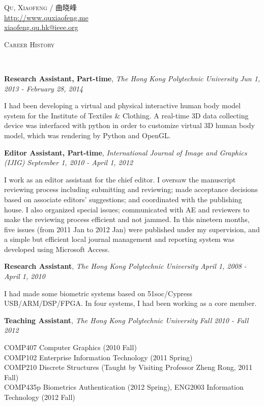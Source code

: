 \documentclass[9pt]{article}
\newenvironment{changemargin}[2]{%
  \begin{list}{}{%
    \setlength{\topsep}{0pt}%
    \setlength{\leftmargin}{#1}%
    \setlength{\rightmargin}{#2}%
    \setlength{\listparindent}{\parindent}%
    \setlength{\itemindent}{\parindent}%
    \setlength{\parsep}{\parskip}%
  }%
  \item[]}{\end{list}
}
\newcommand{\lineover}{
	\begin{changemargin}{-0.05in}{-0.05in}
		\vspace*{-8pt}
		\hrulefill \\
		\vspace*{-2pt}
	\end{changemargin}
}
\newcommand{\header}[1]{
	\begin{changemargin}{-0.5in}{-0.5in}
		\scshape{#1}\\
  	\lineover
	\end{changemargin}
}
\newcommand{\contact}[3]{
	\begin{changemargin}{-0.5in}{-0.5in}
		\begin{center}
			{\Large \scshape {#1}}\\ \smallskip
      {\url{#2}}\\ \smallskip 
      {\href{mailto:#3}{#3}}\\ \smallskip
		\end{center}
	\end{changemargin}
}
\newcommand{\jobtitle}[3]{
	\textbf{#1}, \emph{#2} \hfill \emph{#3}\\
}
\newcommand{\jobdescription}[1]{
	\begin{changemargin}{0.15in}{0.15in}
    \smallskip
		{#1}
    \medskip
	\end{changemargin}
}
\newenvironment{body} {
	\vspace*{-16pt}
	\begin{changemargin}{-0.25in}{-0.5in}
  }	
	{\end{changemargin}
}
\begin{document}
\contact{Qu, Xiaofeng / 曲晓峰}{http://www.quxiaofeng.me}{xiaofeng.qu.hk@ieee.org}


\header{Career History}

\begin{body}
  \vspace{14pt}

    \jobtitle{Research Assistant, Part-time}{The Hong Kong Polytechnic University}{Jun 1, 2013 - February 28, 2014}
    \jobdescription{
        I had been developing a virtual and physical interactive human body model system for the Institute of Textiles \& Clothing. A real-time 3D data collecting device was interfaced with python in order to customize virtual 3D human body model, which was rendering by Python and OpenGL.
    }

    \jobtitle{Editor Assistant, Part-time}{International Journal of Image and Graphics (IJIG)}{September 1, 2010 - April 1, 2012}
    \jobdescription{
        I work as an editor assistant for the chief editor. I oversaw the manuscript reviewing process including submitting and reviewing; made acceptance decisions based on associate editors' suggestions; and coordinated with the publishing house. I also organized special issues; communicated with AE and reviewers to make the reviewing process efficient and not jammed. In this nineteen months, five issues (from 2011 Jan to 2012 Jan) were published under my supervision, and a simple but efficient local journal management and reporting system was developed using Microsoft Access.
    }

	\jobtitle{Research Assistant}{The Hong Kong Polytechnic University}{April 1, 2008 - April 1, 2010}
    \jobdescription{
        I had made some biometric systems based on 51soc/Cypress USB/ARM/DSP/FPGA. In four systems, I had been working as a core member.
    }

	\jobtitle{Teaching Assistant}{The Hong Kong Polytechnic University}{Fall 2010 - Fall 2012}
    \jobdescription {
        COMP407 Computer Graphics (2010 Fall)\\
        COMP102 Enterprise Information Technology (2011 Spring)\\
        COMP210 Discrete Structures (Taught by Visiting Professor Zheng Rong, 2011 Fall)\\ COMP435p Biometrics Authentication (2012 Spring), ENG2003 Information Technology (2012 Fall)
    }

\end{body}
\end{document}
